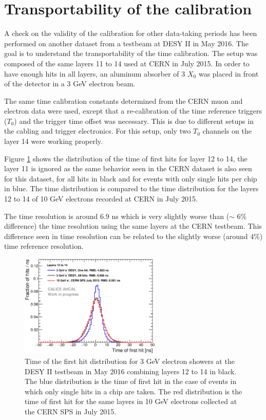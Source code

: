 \section{Transportability of the calibration}

A check on the validity of the calibration for other data-taking periods has been performed on another dataset from a testbeam at DESY II in May 2016. The goal is to understand the transportability of the time calibration. The setup was composed of the same layers 11 to 14 used at CERN in July 2015. In order to have enough hits in all layers, an aluminum absorber of 3 $X_{0}$ was placed in front of the detector in a 3 GeV electron beam.

The same time calibration constants determined from the CERN muon and electron data were used, except that a re-calibration of the time reference triggers ($T_{0}$) and the trigger time offset was necessary. This is due to different setups in the cabling and trigger electronics. For this setup, only two $T_{0}$ channels on the layer 14 were working properly.

Figure \ref{fig:TBMay2016} shows the distribution of the time of first hits for layer 12 to 14, the layer 11 is ignored as the same behavior seen in the CERN dataset is also seen for this dataset, for all hits in black and for events with only single hits per chip in blue. The time distribution is compared to the time distribution for the layers 12 to 14 of 10 GeV electrons recorded at CERN in July 2015.

The time resolution is around 6.9 ns which is very slightly worse than ($\sim$ 6\% difference) the time resolution using the same layers at the CERN testbeam. This difference seen in time resolution can be related to the slightly worse (around 4\%) time reference resolution.

\begin{figure}[htbp!]
	\centering
	\includegraphics[width=0.6\textwidth]{../Thesis_Plots/Timing/Electrons/Plots/Timing_May2016_BigLayers.eps}
	\caption{Time of the first hit distribution for 3 GeV electron showers at the DESY II testbeam in May 2016 combining layers 12 to 14 in black. The blue distribution is the time of first hit in the case of events in which only single hits in a chip are taken. The red distribution is the time of first hit for the same layers in 10 GeV electrons collected at the CERN SPS in July 2015.}\label{fig:TBMay2016}
\end{figure}

